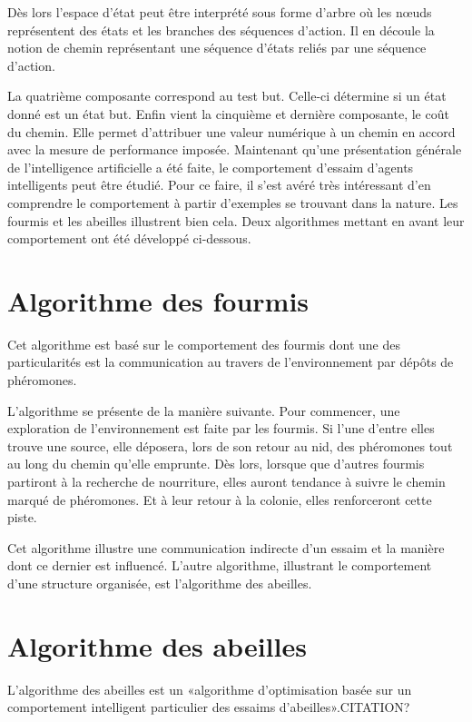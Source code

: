 \documentclass[a4paper]{report}
\begin{document}
Dès lors l'espace d'état peut être interprété sous forme d'arbre où les nœuds représentent des états et les branches des séquences d'action. Il en découle la notion de chemin représentant une séquence d'états reliés par une séquence d'action.

La quatrième composante correspond au test but. Celle-ci détermine si un état donné est un état but. Enfin vient la cinquième et dernière composante, le coût du chemin. Elle permet d'attribuer une valeur numérique à un chemin en accord avec la mesure de performance imposée.
Maintenant qu'une présentation générale de l'intelligence artificielle a été faite, le comportement d'essaim d'agents intelligents peut être étudié. Pour ce faire, il s'est avéré très intéressant d'en comprendre le comportement à partir d'exemples se trouvant dans la nature. Les fourmis et les abeilles illustrent bien cela. Deux algorithmes mettant en avant leur comportement ont été développé ci-dessous.

\section{Algorithme des fourmis}

Cet algorithme est basé sur le comportement des fourmis dont une des particularités est la communication au travers de l'environnement par dépôts de phéromones.

L'algorithme se présente de la manière suivante. Pour commencer, une exploration de l'environnement est faite par les fourmis. Si l'une d'entre elles trouve une source, elle déposera, lors de son retour au nid, des phéromones tout au long du chemin qu'elle emprunte. Dès lors, lorsque que d'autres fourmis partiront à la recherche de nourriture, elles auront tendance à suivre le chemin  marqué de phéromones. Et à leur retour à la colonie, elles renforceront cette piste.\cite{wikiFourmi}

Cet algorithme illustre une communication indirecte d'un essaim et la manière dont ce dernier est influencé.\cite{communicationFourmis} L'autre algorithme, illustrant le comportement d'une structure organisée, est l'algorithme des abeilles.

\section{Algorithme des abeilles}

L'algorithme des abeilles est un «algorithme d'optimisation basée sur un comportement intelligent particulier des essaims d'abeilles».CITATION?
\end{document}
